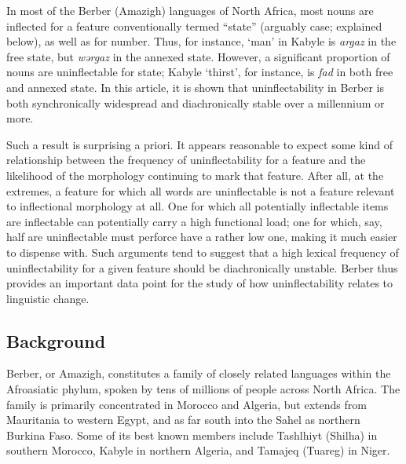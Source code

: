 \documentclass[output=paper]{langscibook}
\begin{document}
\begin{styleStandarduser}
In most of the Berber (Amazigh) languages of North Africa, most nouns are inflected for a feature conventionally termed “state” (arguably case; explained below), as well as for number. Thus, for instance, ‘man’ in Kabyle is \textit{argaz} in the free state, but \textit{wərgaz} in the annexed state. However, a significant proportion of nouns are uninflectable for state; Kabyle ‘thirst’, for instance, is \textit{fad} in both free and annexed state. In this article, it is shown that uninflectability in Berber is both synchronically widespread and diachronically stable over a millennium or more.
\end{styleStandarduser}

\begin{styleStandarduser}
Such a result is surprising a priori. It appears reasonable to expect some kind of relationship between the frequency of uninflectability for a feature and the likelihood of the morphology continuing to mark that feature. After all, at the extremes, a feature for which all words are uninflectable is not a feature relevant to inflectional morphology at all. One for which all potentially inflectable items are inflectable can potentially carry a high functional load; one for which, say, half are uninflectable must perforce have a rather low one, making it much easier to dispense with. Such arguments tend to suggest that a high lexical frequency of uninflectability for a given feature should be diachronically unstable. Berber thus provides an important data point for the study of how uninflectability relates to linguistic change.
\end{styleStandarduser}

\subsection{Background} %
\begin{styleStandarduser}
Berber, or Amazigh, constitutes a family of closely related languages within the Afroasiatic phylum, spoken by tens of millions of people across North Africa. The family is primarily concentrated in Morocco and Algeria, but extends from Mauritania to western Egypt, and as far south into the Sahel as northern Burkina Faso. Some of its best known members include Tashlhiyt (Shilha) in southern Morocco, Kabyle in northern Algeria, and Tamajeq (Tuareg) in Niger.
\end{styleStandarduser}
\end{document}
